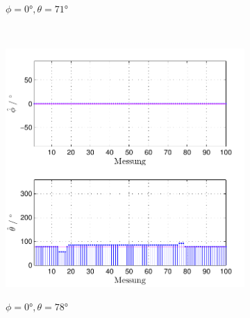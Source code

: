 \begin{figure}
\begin{subfigure}[b]{0.48\textwidth}
                \label{fig:Foto_DSP_Draufsicht}
                \caption{$\phi=0°, \theta = 71°$}
        \end{subfigure}
        ~ %
        \begin{subfigure}[b]{0.48\textwidth}
                \centering
                \includegraphics[width=\textwidth]{images/04_Echtzeitversuch/MALE_Phi_0_Theta_78}
                \label{fig:Foto_DSP_Draufsicht}
                \caption{$\phi=0°, \theta = 78°$}
        \end{subfigure}
         ~ %
        \begin{subfigure}[b]{0.48\textwidth}
                \centering

\end{subfigure}
\end{figure}

